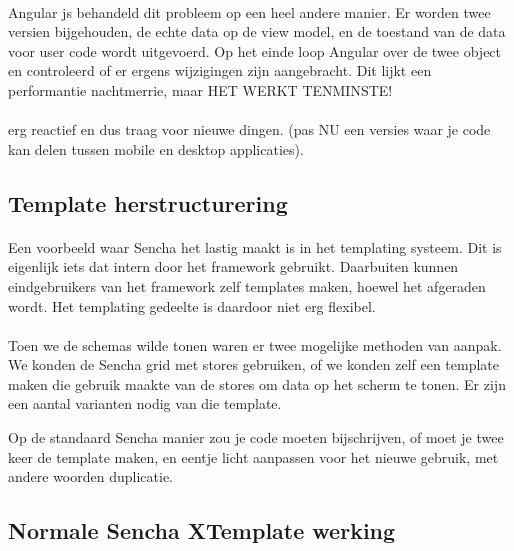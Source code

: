 \paragraph {} Angular js behandeld dit probleem op een heel andere manier. Er worden twee
versien bijgehouden, de echte data op de view model, en de toestand van de data voor user
code wordt uitgevoerd. Op het einde loop Angular over de twee object en controleerd of er
ergens wijzigingen zijn aangebracht. Dit lijkt een performantie nachtmerrie, maar HET
WERKT TENMINSTE!


\paragraph {} erg reactief en dus traag voor nieuwe dingen. (pas NU een versies waar je
code kan delen tussen mobile en desktop applicaties).


\subsection {Template herstructurering}

\paragraph {} Een voorbeeld waar Sencha het lastig maakt is in het templating systeem. Dit
is eigenlijk iets dat intern door het framework gebruikt. Daarbuiten kunnen eindgebruikers
van het framework zelf templates maken, hoewel het afgeraden wordt. Het templating
gedeelte is daardoor niet erg flexibel.

\paragraph {} Toen we de schemas wilde tonen waren er twee mogelijke methoden van aanpak.
We konden de Sencha grid met stores gebruiken, of we konden zelf een template maken die
gebruik maakte van de stores om data op het scherm te tonen. Er zijn een aantal varianten
nodig van die template.

Op de standaard Sencha manier zou je code moeten bijschrijven, of moet je twee keer de
template maken, en eentje licht aanpassen voor het nieuwe gebruik, met andere woorden
duplicatie.


\subsection {Normale Sencha XTemplate werking}

